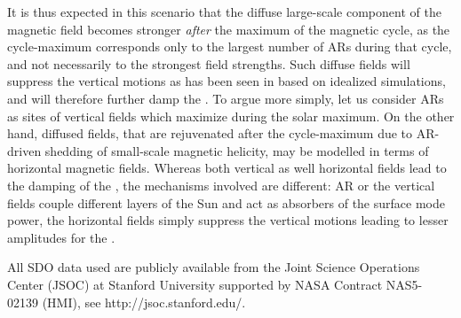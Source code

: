 \documentclass{aa}
\begin{document}
It is thus expected in this scenario that the diffuse large-scale component of the magnetic field
becomes stronger \emph{after} the maximum of the magnetic cycle, as the cycle-maximum corresponds
only to the largest number of ARs during that cycle, and not necessarily to the strongest field
strengths. Such diffuse fields will suppress the vertical motions as has been seen in \citet{S+15}
based on idealized simulations, and will therefore further damp the \fff.
To argue more simply, let us consider ARs as sites of vertical fields which maximize during the
solar maximum. On the other hand, diffused fields, that are rejuvenated after the cycle-maximum due
to AR-driven shedding of small-scale magnetic helicity, may be modelled in terms of horizontal
magnetic fields. Whereas both vertical as well horizontal fields lead to the damping of the
\fff, the mechanisms involved are different: AR or the vertical fields couple different layers
of the Sun and act as absorbers of the surface mode power, the horizontal fields simply suppress the
vertical motions leading to lesser amplitudes for the \fff.

\begin{acknowledgements}
All SDO data used are publicly available from the Joint Science Operations Center (JSOC) at Stanford University supported by NASA Contract NAS5- 02139 (HMI), see http://jsoc.stanford.edu/. 
\end{acknowledgements}

{}

\end{document}
